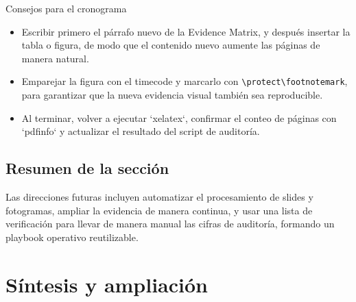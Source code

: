 \documentclass[a4paper]{article}
\begin{document}
\begin{knowledgebox}{Consejos para el cronograma}
\begin{itemize}
    \item Escribir primero el párrafo nuevo de la Evidence Matrix, y después insertar la tabla o figura, de modo que el contenido nuevo aumente las páginas de manera natural.
    \item Emparejar la figura con el timecode y marcarlo con \verb|\protect\footnotemark|, para garantizar que la nueva evidencia visual también sea reproducible.
    \item Al terminar, volver a ejecutar `xelatex`, confirmar el conteo de páginas con `pdfinfo` y actualizar el resultado del script de auditoría.
\end{itemize}
\end{knowledgebox}

\subsection{Resumen de la sección}
Las direcciones futuras incluyen automatizar el procesamiento de slides y fotogramas, ampliar la evidencia de manera continua, y usar una lista de verificación para llevar de manera manual las cifras de auditoría, formando un playbook operativo reutilizable.
\section{Síntesis y ampliación}
\end{document}
